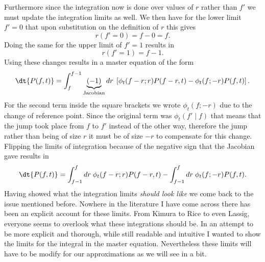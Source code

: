Furthermore since the integration now is done over values of $r$ rather than
$f'$ we must update the integration limits as well. We then have for the lower
limit $f' = 0$ that upon substitution on the definition of $r$ this gives
\begin{equation}
  r(f' = 0) = f - 0 = f.
\end{equation}
Doing the same for the upper limit of $f' = 1$ results in
\begin{equation}
  r(f' = 1) = f - 1.
\end{equation}
Using these changes results in a master equation of the form
\begin{equation}
  \dt{P(f, t)} = \int_f^{f - 1} \underbrace{(-1)}_{\text{Jacobian}} dr \;
  \left[
  \phi_t(f - r; r) P(f - r, t) -
  \phi_t(f; -r) P(f, t)
  \right].
\end{equation}
For the second term inside the square brackets we wrote $\phi_t(f; -r)$ due to
the change of reference point. Since the original term was $\phi_t(f' \mid f)$
that means that the jump took place from $f$ to $f'$ instead of the other way,
therefore the jump rather than being of size $r$ it must be of size $-r$ to
compensate for this change. Flipping the limits of integration because of the
negative sign that the Jacobian gave results in
\begin{equation}
  \dt{P(f, t)} = \int^f_{f - 1} dr \;
  \phi_t(f - r; r) P(f - r, t) -
  \int^f_{f - 1} dr \;
  \phi_t(f; -r) P(f, t).
  \label{eq_master_eq_jump}
\end{equation}
Having showed what the integration limits \textit{should look like} we come back
to the issue mentioned before. Nowhere in the literature I have come across
there has been an explicit account for these limits. From Kimura to Rice to even
Lassig, everyone seems to overlook what these integrations should be. In an
attempt to be more explicit and thorough, while still readable and intuitive I
wanted to show the limits for the integral in the master equation. Nevertheless
these limits will have to be modify for our approximations as we will see in a
bit.

